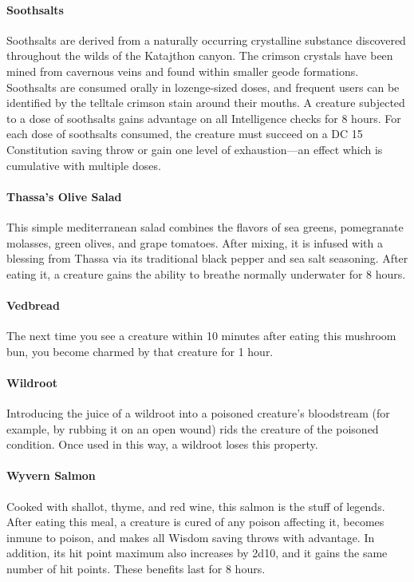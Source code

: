     \paragraph{Soothsalts}
		Soothsalts are derived from a naturally occurring crystalline substance discovered throughout the wilds of the Katajthon canyon.
        The crimson crystals have been mined from cavernous veins and found within smaller geode formations.
        Soothsalts are consumed orally in lozenge-sized doses, and frequent users can be identified by the telltale crimson stain around their mouths.
        A creature subjected to a dose of soothsalts gains advantage on all Intelligence checks for 8 hours.
		For each dose of soothsalts consumed, the creature must succeed on a DC 15 Constitution saving throw or gain one level of exhaustion---an effect which is cumulative with multiple doses.
    \paragraph{Thassa's Olive Salad}
        This simple mediterranean salad combines the flavors of sea greens, pomegranate molasses, green olives, and grape tomatoes.
        After mixing, it is infused with a blessing from Thassa via its traditional black pepper and sea salt seasoning.
        After eating it, a creature gains the ability to breathe normally underwater for 8 hours.
    \paragraph{Vedbread}
        The next time you see a creature within 10 minutes after eating this mushroom bun, you become charmed by that creature for 1 hour.
    \paragraph{Wildroot}
        Introducing the juice of a wildroot into a poisoned creature's bloodstream (for example, by rubbing it on an open wound) rids the creature of the poisoned condition.
        Once used in this way, a wildroot loses this property.
    \paragraph{Wyvern Salmon}
        Cooked with shallot, thyme, and red wine, this salmon is the stuff of legends.
        After eating this meal, a creature is cured of any poison affecting it, becomes inmune to poison, and makes all Wisdom saving throws with advantage.
        In addition, its hit point maximum also increases by 2d10, and it gains the same number of hit points.
        These benefits last for 8 hours.
